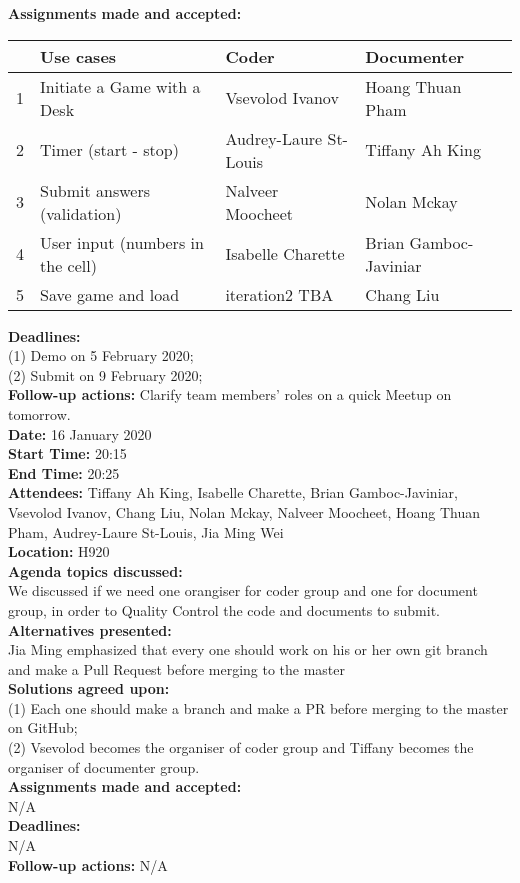 \documentclass[12pt]{article}
\begin{document}
{\bf Assignments made and accepted:} 
\begin{center}
 \begin{tabular}{||c |l |l |l||} 
 \hline
   & Use cases & Coder & Documenter \\ [0.5ex] 
 \hline\hline
 1 & Initiate a Game with a Desk  & Vsevolod Ivanov & Hoang Thuan Pham \\ 
 \hline
 2 & Timer (start - stop) & Audrey-Laure St-Louis  & Tiffany Ah King \\
 \hline
 3 & Submit answers (validation) & Nalveer Moocheet & Nolan Mckay \\
 \hline
 4 &  User input (numbers in the cell) & Isabelle Charette & Brian Gamboc-Javiniar \\
 \hline
 5 & Save game and load & iteration2 TBA & Chang Liu \\ [1ex] 
 \hline
 \end{tabular}
\end{center}
{\bf Deadlines:} \\(1) Demo on 5 February 2020; \\(2)  Submit on 9 February 2020; \\
{\bf Follow-up actions:} Clarify team members' roles on a quick Meetup on tomorrow.\\

\newpage
{\bf Date:} 16 January 2020\\
{\bf Start Time:} 20:15\\
{\bf End Time:}  20:25\\
{\bf Attendees:} Tiffany Ah King,
Isabelle Charette,
Brian Gamboc-Javiniar,
Vsevolod Ivanov,
Chang Liu,
Nolan Mckay,
Nalveer Moocheet,
Hoang Thuan Pham,
Audrey-Laure St-Louis,
Jia Ming Wei\\
{\bf Location:} H920 \\
{\bf Agenda topics discussed:} \\We discussed if we need one orangiser for coder group and one for document group, in order to Quality Control the code and documents to submit.\\
{\bf Alternatives presented:} \\  Jia Ming emphasized that every one should work on his or her own git branch and make a Pull Request before merging to the master\\
{\bf Solutions agreed upon:} \\(1) Each one should make a branch and make a PR before merging to the master on GitHub; \\(2) Vsevolod becomes the organiser of coder group and Tiffany becomes the organiser of documenter group. \\
{\bf Assignments made and accepted:} \\N/A\\
{\bf Deadlines:} \\ N/A \\
{\bf Follow-up actions:} N/A\\
\end{document}

